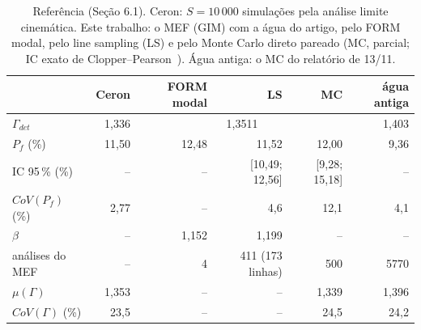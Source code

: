 \begin{table}[htbp]\centering\footnotesize
\caption{Referência (Seção 6.1). Ceron: $S = 10\,000$ simulações pela análise limite cinemática. Este trabalho: o MEF (GIM) com a água do artigo, pelo FORM modal, pelo line sampling (LS) e pelo Monte Carlo direto pareado (MC, parcial; IC exato de Clopper--Pearson~\cite{clopper1934}). Água antiga: o MC do relatório de 13/11.}\label{tab:ref}
\begin{tabular}{lrrrrr}\toprule
& Ceron & FORM modal & LS & MC & água antiga \\\midrule
$\Gamma_{det}$ & 1{,}336 & \multicolumn{3}{c}{1{,}3511} & 1{,}403 \\
$P_f$ (\%) & 11{,}50 & 12{,}48 & 11{,}52 & 12{,}00 & 9{,}36 \\
IC 95\,\% (\%) & -- & -- & [10{,}49; 12{,}56] & [9{,}28; 15{,}18] & -- \\
$CoV(P_f)$ (\%) & 2{,}77 & -- & 4{,}6 & 12{,}1 & 4{,}1 \\
$\beta$ & -- & 1{,}152 & 1{,}199 & -- & -- \\
análises do MEF & -- & 4 & 411 (173 linhas) & 500 & 5770 \\
$\mu(\Gamma)$ & 1{,}353 & -- & -- & 1{,}339 & 1{,}396 \\
$CoV(\Gamma)$ (\%) & 23{,}5 & -- & -- & 24{,}5 & 24{,}2 \\
\bottomrule\end{tabular}\end{table}

